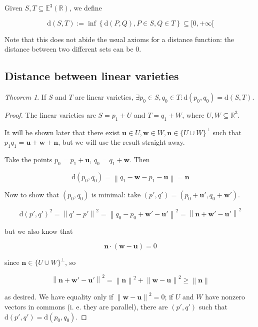 \documentclass[12pt,a4paper]{report}
\newcommand{\norm}[1]{\left\lVert#1\right\rVert}
\numberwithin{equation}{section}
\theoremstyle{definition}
\theoremstyle{remark}
\newtheorem{theorem}{Theorem}[section]
\begin{document}
Given $S, T \subseteq \mathbb{E}^3 (\mathbb{R})$, we define

\begin{equation}
\text{d} (S, T) := \inf \left\lbrace \text{d} (P, Q), P \in S, Q \in T\right\rbrace \subseteq [0, +\infty [
\end{equation}

Note that this does not abide the usual axioms for a distance function: the distance between two different sets can be 0.

\subsection{Distance between linear varieties}

\begin{theorem}
If $S$ and $T$ are linear varieties, $\exists p_0 \in S, q_0 \in T : \text{d} (p_0, q_0) = \text{d} (S, T)$.
\end{theorem}

\begin{proof}
The linear varieties are $S = p_1 + U$ and  $T= q_1 + W$, where $U, W \subseteq \mathbb{R}^3$.

It will be shown later that there exist $\mathbf{u} \in U, \mathbf{w} \in W, \mathbf{n} \in \lbrace U \cup W \rbrace ^\perp$ such that $p_1 q_1 = \mathbf{u} + \mathbf{w} + \mathbf{n}$, but we will use the result straight away.

Take the points $p_0 = p_1 + \mathbf{u}$, $q_0 = q_1 + \mathbf{w}$. Then

\begin{equation}
\text{d}(p_0, q_0) = \norm{q_1 - \mathbf{w} - p_1 - \mathbf{u}} = \mathbf{n}
\end{equation}

Now to show that $(p_0, q_0)$ is minimal: take $(p', q') = (p_0 + \mathbf{u}', q_0 + \mathbf{w}')$.

\begin{equation}
\text{d}(p', q')^2 = \norm{q'-p'}^2 = \norm{q_0 - p_0 + \mathbf{w}' - \mathbf{u}'}^2 = \norm{\mathbf{n} + \mathbf{w}' - \mathbf{u}'}^2 
\end{equation}

but we also know that

\begin{equation}
\mathbf{n} \cdot (\mathbf{w} - \mathbf{u}) = 0
\end{equation}

since $\mathbf{n} \in \lbrace U \cup W \rbrace ^\perp$, so

\begin{equation}
\norm{\mathbf{n} + \mathbf{w}' - \mathbf{u}'}^2 = \norm{\mathbf{n}}^2 + \norm{\mathbf{w} -\mathbf{u}}^2 \geq \norm{\mathbf{n}}
\end{equation}

as desired. We have equality only if $\norm{\mathbf{w} -\mathbf{u}}^2=0$; if $U$ and $W$ have nonzero vectors in commons (i. e. they are parallel), there are $(p', q')$ such that $\text{d}(p', q')=\text{d}(p_0, q_0)$. 
\end{proof}
\end{document}
